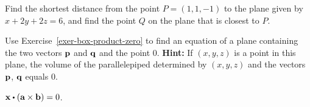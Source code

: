 \begin{enumialphparenastyle}
\begin{ex}
  Find the shortest distance from the point $P = (1,1,-1)$ to the plane
  given by $x + 2y + 2z = 6$, and find the point $Q$ on the plane
  that is closest to $P$.
\end{ex}

\begin{ex}
  Use Exercise~\ref{exer-box-product-zero} to find an equation of a
  plane containing the two vectors $\mbox{\bf p}$ and $\mbox{\bf q}$ and the
  point $0$. \textbf{Hint:} If $(x,y,z)$ is a point in this
  plane, the volume of the parallelepiped determined by $(x,y,z)$
  and the vectors $\mbox{\bf p}$, $\mbox{\bf q}$ equals 0.
  \begin{sol}
    $\vect{x}\dotprod (\vect{a}\times \vect{b}) =0$.
  \end{sol}
\end{ex}

\end{enumialphparenastyle}
